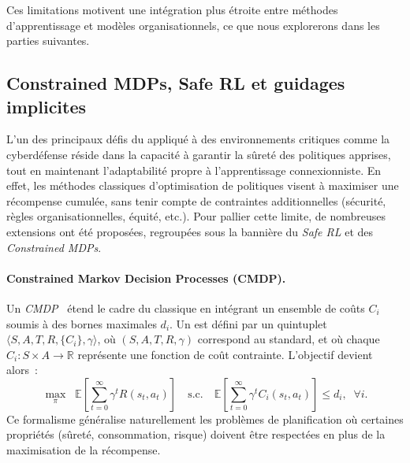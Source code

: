 Ces limitations motivent une intégration plus étroite entre méthodes d'apprentissage et modèles organisationnels, ce que nous explorerons dans les parties suivantes.



\subsection{Constrained MDPs, Safe RL et guidages implicites}

\noindent
L’un des principaux défis du  appliqué à des environnements critiques
comme la cyberdéfense réside dans la capacité à garantir la sûreté des politiques apprises,
tout en maintenant l’adaptabilité propre à l’apprentissage connexionniste.
En effet, les méthodes classiques d’optimisation de politiques visent à maximiser une récompense cumulée,
sans tenir compte de contraintes additionnelles (sécurité, règles organisationnelles, équité, etc.).
Pour pallier cette limite, de nombreuses extensions ont été proposées, regroupées sous la bannière
du \textit{Safe RL} et des \textit{Constrained MDPs}.

\paragraph{Constrained Markov Decision Processes (CMDP).}
Un \textit{CMDP}~\cite{altman1999constrained} étend le cadre du  classique en intégrant
un ensemble de coûts $C_i$ soumis à des bornes maximales $d_i$.
Un  est défini par un quintuplet
$\langle S, A, T, R, \{C_i\}, \gamma \rangle$,
où $(S,A,T,R,\gamma)$ correspond au  standard, et où
chaque $C_i : S \times A \rightarrow \mathbb{R}$ représente une fonction de coût contrainte.
L’objectif devient alors~:
\[
    \max_{\pi} \;\; \mathbb{E}\!\left[\sum_{t=0}^\infty \gamma^t R(s_t,a_t)\right]
    \quad \text{s.c.} \quad
    \mathbb{E}\!\left[\sum_{t=0}^\infty \gamma^t C_i(s_t,a_t)\right] \leq d_i, \;\; \forall i.
\]
Ce formalisme généralise naturellement les problèmes de planification où certaines propriétés
(sûreté, consommation, risque) doivent être respectées en plus de la maximisation de la récompense.

